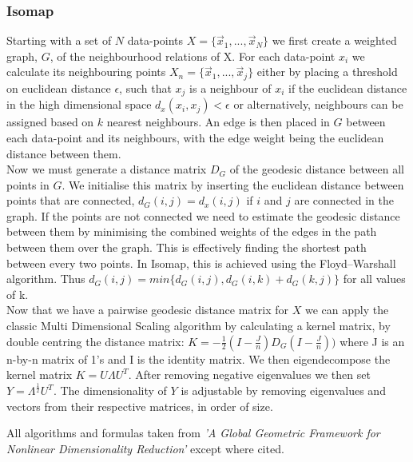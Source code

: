 \documentclass{article}
\begin{document}
\subsubsection{Isomap}
Starting with a set of $N$ data-points $X = \{\vec{x}_1,...,\vec{x}_N\}$ we first create a weighted graph, $G$, of the neighbourhood relations of X. For each data-point $x_i$ we calculate its neighbouring points $X_n = \{\vec{x}_1,...,\vec{x}_j\}$ either by placing a threshold on euclidean distance $\epsilon$, such that $x_j$ is a neighbour of $x_i$ if the euclidean distance in the high dimensional space $d_x(x_i,x_j) < \epsilon$ or alternatively, neighbours can be assigned based on $k$ nearest neighbours. An edge is then placed in $G$ between each data-point and its neighbours, with the edge weight being the euclidean distance between them. \\
Now we must generate a distance matrix $D_G$ of the geodesic distance between all points in $G$. We initialise this matrix by inserting the euclidean distance between points that are connected, $d_G(i,j) = d_x(i,j)$ if $i$ and $j$ are connected in the graph. If the points are not connected we need to estimate the geodesic distance between them by minimising the combined weights of the edges in the path between them over the graph. This is effectively finding the shortest path between every two points. In Isomap, this is achieved using the Floyd–Warshall algorithm.\cite{floyd1962algorithm} Thus $ d_G(i,j) = min\{d_G(i,j),d_G(i,k) + d_G(k,j)\}$ for all values of k. \\
Now that we have a pairwise geodesic distance matrix for $X$ we can apply the classic Multi Dimensional Scaling algorithm by calculating a kernel matrix, by double centring the distance matrix: $K = -\frac{1}{2}(I - \frac{J}{n})D_G(I-\frac{J}{n}))$ where J is an n-by-n matrix of 1's and I is the identity matrix. We then eigendecompose the kernel matrix $K = U\Lambda U^T$. After removing negative eigenvalues we then set $Y = \Lambda^{\frac{1}{2}}U^T$. The dimensionality of $Y$ is adjustable by removing eigenvalues and vectors from their respective matrices, in order of size.

All algorithms and formulas taken from \textit{'A Global Geometric Framework for Nonlinear Dimensionality Reduction'}\cite{tenenbaum2000global} except where cited.
\end{document}
